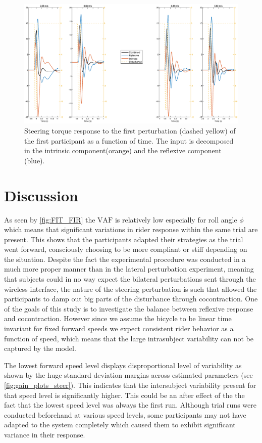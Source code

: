 \begin{figure}[h!]
    \centering

    \includegraphics[width=\linewidth]{images/steer_irf/param_input.eps}
    \caption{Steering torque response to the first perturbation (dashed yellow) of the first participant as a function of time. The input is decomposed in the intrinsic component(orange) and the reflexive component (blue). }
    \label{fig:param_input}
\end{figure}
\section{Discussion}
As seen by \cref{fig:FIT_FIR} the \ensuremath{\mathrm{VAF}} is relatively low especially for roll angle \ensuremath{\phi} which means that significant variations in rider response within the same trial are present. This shows that the participants adapted their strategies as the trial went forward, consciously choosing to be more compliant or stiff depending on the situation. Despite the fact the experimental procedure was conducted in a much more proper manner than in the lateral perturbation experiment, meaning that subjects could in no way expect the bilateral perturbations sent through the wireless interface, the nature of the steering perturbation is such that allowed the participants to damp out big parts of the disturbance through cocontraction. One of the goals of this study is to investigate  the balance between reflexive response and cocontraction. However since we assume the bicycle to be linear time invariant for fixed forward speeds we expect consistent rider behavior as a function of speed, which means that the large intrasubject variability can not be captured by the model.

The lowest forward speed level displays disproportional level of variability as shown by the huge standard deviation margins across estimated parameters (see \cref{fig:gain_plots_steer}). This indicates that the intersubject variability present for that speed level is significantly higher. This could be an after effect of the the fact that the lowest speed level was always the first run. Although trial runs were conducted beforehand at various speed levels, some participants may not have adapted to the system completely which caused them to exhibit significant variance in their response.

